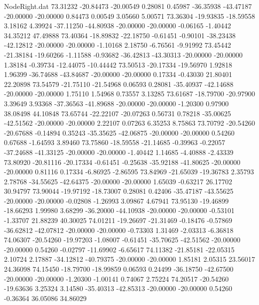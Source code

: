 \begin{filecontents}{NodeRight.dat}
  73.31232  -20.84473  -20.00549     0.28081    0.45987  -36.35938  -43.47187  -20.00000  -20.00000    0.84473    0.00549    3.05660    5.00571
  73.36304  -19.93835  -18.59558     3.18162    4.39924  -37.11250  -44.80938  -20.00000  -20.00000   -0.06165   -1.40442   34.35212   47.49888
  73.40364  -18.89832  -22.18750    -0.61451   -0.90101  -38.23438  -42.12812  -20.00000  -20.00000   -1.10168    2.18750   -6.76561   -9.91992
  73.45442  -21.38184  -19.60266    -1.11588   -0.93682  -36.42813  -43.30313  -20.00000  -20.00000    1.38184   -0.39734  -12.44075  -10.44442
  73.50513  -20.17334  -19.56970     1.92818    1.96399  -36.74688  -43.84687  -20.00000  -20.00000    0.17334   -0.43030   21.80401   22.20898
  73.54579  -21.75110  -21.54968     0.06593    0.28081  -35.40937  -42.14688  -20.00000  -20.00000    1.75110    1.54968    0.73557    3.13285
  73.61687  -18.79700  -20.97900     3.39649    3.93368  -37.36563  -41.89688  -20.00000  -20.00000   -1.20300    0.97900   38.08498   44.10848
  73.65744  -22.22107  -20.07263     0.56731    0.78218  -35.00625  -42.51562  -20.00000  -20.00000    2.22107    0.07263    6.35253    8.75863
  73.70792  -20.54260  -20.67688    -0.14894    0.35243  -35.35625  -42.06875  -20.00000  -20.00000    0.54260    0.67688   -1.64593    3.89460
  73.75860  -18.59558  -21.14685    -0.39963   -0.22057  -37.24688  -41.33125  -20.00000  -20.00000   -1.40442    1.14685   -4.40888   -2.43339
  73.80920  -20.81116  -20.17334    -0.61451   -0.25638  -35.92188  -41.80625  -20.00000  -20.00000    0.81116    0.17334   -6.86925   -2.86595
  73.84969  -21.65039  -19.36783     2.35793    2.78768  -34.55625  -42.64375  -20.00000  -20.00000    1.65039   -0.63217   26.17702   30.94797
  73.90044  -19.97192  -18.73007     0.28081    0.42406  -35.47187  -43.55625  -20.00000  -20.00000   -0.02808   -1.26993    3.09867    4.67941
  73.95130  -19.46899  -18.66293     1.99980    3.68299  -36.20000  -44.10938  -20.00000  -20.00000   -0.53101   -1.33707   21.88239   40.30025
  74.01211  -19.26697  -21.31469    -0.18476   -0.57869  -36.62812  -42.07812  -20.00000  -20.00000   -0.73303    1.31469   -2.03313   -6.36818
  74.06307  -20.54260  -19.97203    -1.08007   -0.61451  -35.70625  -42.51562  -20.00000  -20.00000    0.54260   -0.02797  -11.69902   -6.65617
  74.11382  -21.85181  -22.05315     2.10724    2.17887  -34.12812  -40.79375  -20.00000  -20.00000    1.85181    2.05315   23.56017   24.36098
  74.15450  -18.79700  -18.99859     0.06593    0.24499  -36.18750  -42.67500  -20.00000  -20.00000   -1.20300   -1.00141    0.74067    2.75224
  74.20517  -20.54260  -19.63636     3.25324    3.14580  -35.40313  -42.85313  -20.00000  -20.00000    0.54260   -0.36364   36.05086   34.86029

\end{filecontents}
